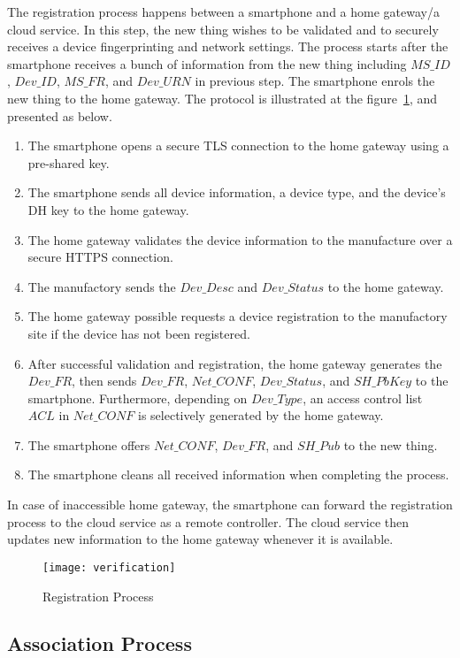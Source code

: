 The registration process happens between a smartphone and a home gateway/a cloud service. In this step, the new thing wishes to be validated and to securely receives a device fingerprinting and network settings. The process starts after the smartphone receives a bunch of information from the new thing including $MS\_ID$, $Dev\_ID$, $MS\_FR$, and $Dev\_URN$ in previous step. The smartphone enrols the new thing to the home gateway. The protocol is illustrated at the figure~\ref{registration}, and presented as below.
\begin{enumerate}
\item The smartphone opens a secure TLS connection to the home gateway using a pre-shared key.
\item The smartphone sends all device information, a device type, and the device's DH key to the home gateway. 
\item The home gateway validates the device information to the manufacture  over a secure HTTPS connection. 
\item The manufactory sends the $Dev\_Desc$ and $Dev\_Status$ to the home gateway.
\item The home gateway possible requests a device registration to the manufactory site if the device has not been registered. 
\item After successful validation and registration, the home gateway generates the $Dev\_FR$, then sends $Dev\_FR$, $Net\_CONF$, $Dev\_Status$, and $SH\_PbKey$ to the smartphone. Furthermore, depending on $Dev\_Type$, an access control list $ACL$ in $Net\_CONF$ is selectively generated by the home gateway.
\item The smartphone offers $Net\_CONF$, $Dev\_FR$, and $SH\_Pub$ to the new thing.
\item The smartphone cleans all received information when completing the process. 
\end{enumerate}

In case of inaccessible home gateway, the smartphone can forward the registration process to the cloud service as a remote controller. The cloud service then updates new information to the home gateway whenever it is available. 
\begin{figure}
  \centering
  \texttt{[image: verification]}
  \caption{Registration Process}
  \label{registration}
\end{figure}

\subsection{Association Process}

